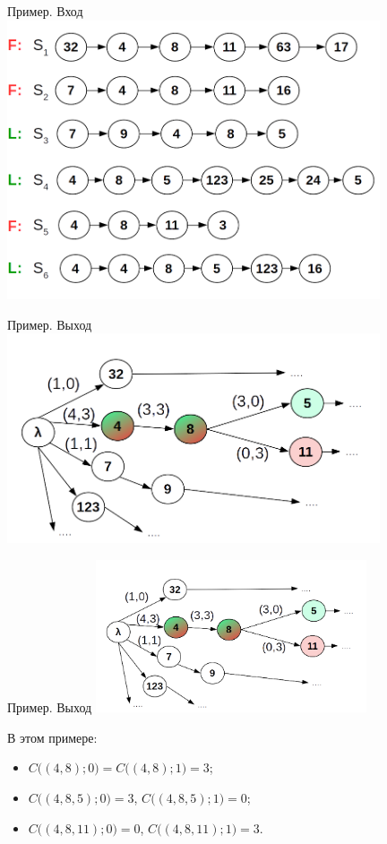 \begin{frame}{Пример. Вход}
	\centering
	\includegraphics[width=11cm]{../pic/beh/idea_2.png}
\end{frame}

\begin{frame}{Пример. Выход}
	\centering
	\includegraphics[width=11cm]{../pic/beh/D_example.png}
\end{frame}

\begin{frame}{Пример. Выход}
	\includegraphics[width=8cm]{../pic/beh/D_example.png}
	
	В этом примере:
	\begin{itemize}
		\item $C \big( (4,8); 0\big) =  C \big( (4,8); 1\big) = 3$;
		\item $C \big( (4,8,5); 0\big) = 3$, $C \big( (4,8,5); 1\big) = 0$;
		\item $C \big( (4,8,11); 0\big) = 0$, $C \big( (4,8,11); 1\big) = 3$.
	\end{itemize}
	
\end{frame}


